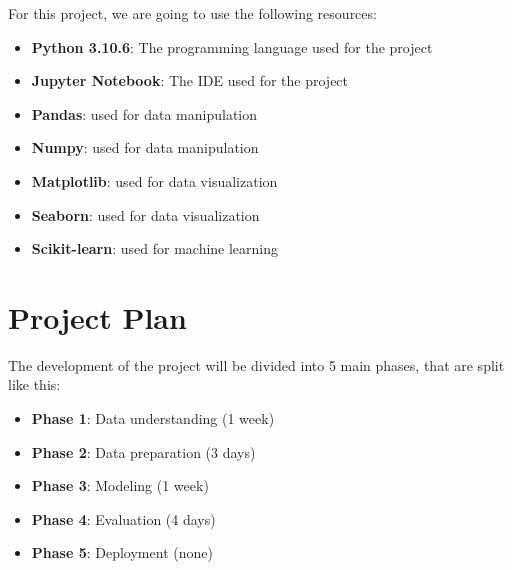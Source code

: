 For this project, we are going to use the following resources:

\begin{itemize}
    \item \textbf{Python 3.10.6}: The programming language used for the project
    \item \textbf{Jupyter Notebook}: The IDE used for the project
    \item \textbf{Pandas}: used for data manipulation
    \item \textbf{Numpy}: used for data manipulation
    \item \textbf{Matplotlib}: used for data visualization
    \item \textbf{Seaborn}: used for data visualization
    \item \textbf{Scikit-learn}: used for machine learning 
\end{itemize}

\section{Project Plan}
\label{subsec:project_plan}

The development of the project will be divided into 5 main phases, that are split like this:

\begin{itemize}
    \item \textbf{Phase 1}: Data understanding (1 week)
    \item \textbf{Phase 2}: Data preparation (3 days)
    \item \textbf{Phase 3}: Modeling (1 week)
    \item \textbf{Phase 4}: Evaluation (4 days)
    \item \textbf{Phase 5}: Deployment (none)
\end{itemize}

\newpage
